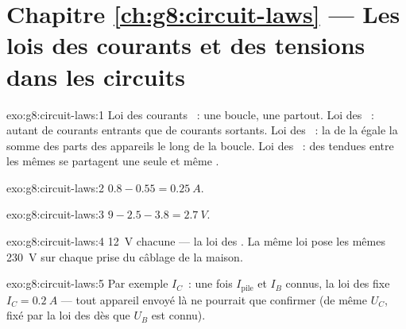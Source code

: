 \section*{Chapitre \ref{ch:g8:circuit-laws} --- Les lois des courants et des tensions dans les circuits}

\begin{solution}{exo:g8:circuit-laws:1}
Loi des courants ~: une boucle, une  partout. Loi
des ~: autant de courants entrants que de courants sortants. Loi
des  ~: la  de la  égale la somme des
parts des appareils le long de la boucle. Loi des  ~: des  tendues entre les mêmes  se partagent
une seule et même .
\end{solution}

\begin{solution}{exo:g8:circuit-laws:2}
$0.8 - 0.55 = \qty{0.25}{A}$.
\end{solution}

\begin{solution}{exo:g8:circuit-laws:3}
$9 - 2.5 - 3.8 = \qty{2.7}{V}$.
\end{solution}

\begin{solution}{exo:g8:circuit-laws:4}
\qty{12}{V} chacune --- la loi des  . La même
loi pose les mêmes \qty{230}{V} sur chaque prise du câblage  de la maison.
\end{solution}

\begin{solution}{exo:g8:circuit-laws:5}
Par exemple $I_C$~: une fois $I_{\text{pile}}$ et $I_B$ connus, la
loi des  fixe $I_C = \qty{0.2}{A}$ --- tout appareil envoyé là
ne pourrait que confirmer (de même $U_C$, fixé par la loi des
  dès que $U_B$ est connu).
\end{solution}

